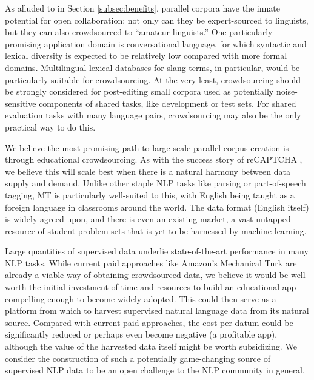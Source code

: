 As alluded to in Section \ref{subsec:benefits}, parallel corpora have the innate potential for open collaboration; not only can they be expert-sourced to linguists, but they can also crowdsourced to ``amateur linguists.''
One particularly promising application domain is conversational language, for which syntactic and lexical diversity is expected to be relatively low compared with more formal domains. 
Multilingual lexical databases for slang terms, in particular, would be particularly suitable for crowdsourcing.
At the very least, crowdsourcing should be strongly considered for post-editing small corpora used as potentially noise-sensitive components of shared tasks, like development or test sets.
For shared evaluation tasks with many language pairs, crowdsourcing may also be the only practical way to do this.

We believe the most promising path to large-scale parallel corpus creation is through educational crowdsourcing.
As with the success story of reCAPTCHA , we believe this will scale best when there is a natural harmony between data supply and demand.
Unlike other staple NLP tasks like parsing or part-of-speech tagging, MT is particularly well-suited to this, with English being taught as a foreign language in classrooms around the world.
The data format (English itself) is widely agreed upon, and there is even an existing market, a vast untapped resource of student problem sets that is yet to be harnessed by machine learning.

Large quantities of supervised data underlie state-of-the-art performance in many NLP tasks.
While current paid approaches like Amazon's Mechanical Turk are already a viable way of obtaining crowdsourced data, we believe it would be well worth the initial investment of time and resources to build an educational app compelling enough to become widely adopted.
This could then serve as a platform from which to harvest supervised natural language data from its natural source. 
Compared with current paid approaches, the cost per datum could be significantly reduced or perhaps even become negative (a profitable app), although the value of the harvested data itself might be worth subsidizing.
We consider the construction of such a potentially game-changing source of supervised NLP data to be an open challenge to the NLP community in general.


